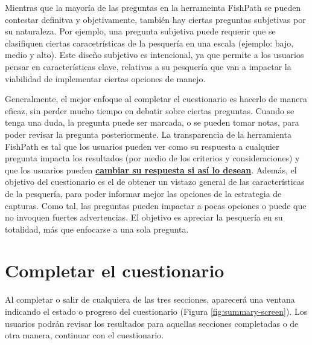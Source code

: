\documentclass[
  11pt,
]{book}
\begin{document}
Mientras que la mayoría de las preguntas en la herrameinta FishPath se pueden contestar definitva y objetivamente, también hay ciertas preguntas subjetivas por su naturaleza. Por ejemplo, una pregunta subjetiva puede requerir que se clasifiquen ciertas caracetrísticas de la pesquería en una escala (ejemplo: bajo, medio y alto). Este diseño subjetivo es intencional, ya que permite a los usuarios pensar en características clave, relativas a su pesquería que van a impactar la viabilidad de implementar ciertas opciones de manejo.

Generalmente, el mejor enfoque al completar el cuestionario es hacerlo de manera eficaz, sin perder mucho tiempo en debatir sobre ciertas preguntas. Cuando se tenga una duda, la pregunta puede ser marcada, o se pueden tomar notas, para poder revisar la pregunta posteriormente. La transparencia de la herramienta FishPath es tal que los usuarios pueden ver como su respuesta a cualquier pregunta impacta los resultados (por medio de los criterios y consideraciones) y que los usuarios pueden \protect\hyperlink{Bookmark-Influential}{\textbf{cambiar su respuesta si así lo desean}}. Además, el objetivo del cuestionario es el de obtener un vistazo general de las características de la pesquería, para poder informar mejor las opciones de la estrategia de capturas. Como tal, las preguntas pueden impactar a pocas opciones o puede que no invoquen fuertes advertencias. El objetivo es apreciar la pesquería en su totalidad, más que enfocarse a una sola pregunta.

\hypertarget{completar-el-cuestionario}{%
\section{Completar el cuestionario}\label{completar-el-cuestionario}}

Al completar o salir de cualquiera de las tres secciones, aparecerá una ventana indicando el estado o progreso del cuestionario (Figura \ref{fig:summary-screen}). Los usuarios podrán revisar los resultados para aquellas secciones completadas o de otra manera, continuar con el cuestionario.
\end{document}
